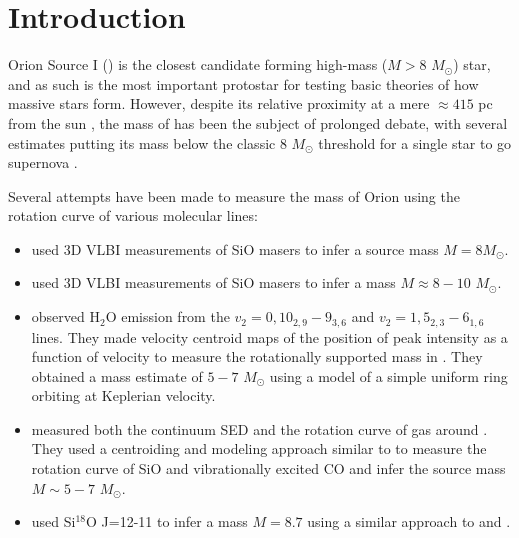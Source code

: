 \documentclass[twocolumn]{aastex61}
\let\oldarcsec\arcsec
\renewcommand\arcsec{\oldarcsec\xspace}%
\newcommand{\msun}{\ensuremath{M_{\odot}}\xspace}			%
\newcommand{\water}{H$_{2}$O\xspace}		%
\newcommand{\kms}{\textrm{km~s}\ensuremath{^{-1}}\xspace}	%
\begin{document}
\section{Introduction}
Orion Source I (\sourcei) is the closest candidate forming high-mass ($M>8$ \msun) star, 
and as such is the most important protostar for testing basic theories
of how massive stars form.  However, despite its relative proximity at
a mere $\approx415$ pc from the sun \citep{Menten2007a,Kim2008a}, the mass of \sourcei
has been the subject of prolonged debate, with several estimates
putting
its mass below the classic 8 \msun threshold for a single star to go supernova
\citep[][]{Heger2003}.


Several attempts have been made to measure the mass of Orion \sourcei using the
rotation curve of various molecular lines:
\begin{itemize}
    \item \citet{Kim2008a} used 3D VLBI measurements of SiO masers  to infer a
        source mass $M=8$\msun.
    \item \citet{Matthews2010a} used 3D VLBI measurements of SiO masers %
        to infer a mass $M\approx8-10$ \msun.
    \item \citet{Hirota2014a} observed \water emission
        from the $v_2=0, 10_{2,9}-9_{3,6}$ and  $v_2=1, 5_{2,3}-6_{1,6}$ lines.
        They made
        velocity centroid maps of the position of peak intensity
        as a function of velocity to measure the rotationally supported
        mass in \sourcei.  They obtained a mass estimate of $5-7$ \msun
        using a model of a simple uniform
        ring orbiting at Keplerian velocity.
    \item \citet{Plambeck2016a} measured both the continuum SED and the rotation
        curve of gas around \sourcei.  They used a centroiding and modeling approach
        similar to \citet{Hirota2014a} to measure the rotation curve of SiO and
        vibrationally excited CO and infer the source mass $M\sim5-7$ \msun.
    \item \citet{Hirota2017b} used Si$^{18}$O J=12-11 to infer a mass $M=8.7$
        using a similar approach to \citet{Hirota2014a} and \citet{Plambeck2016a}.
\end{itemize}
\end{document}
